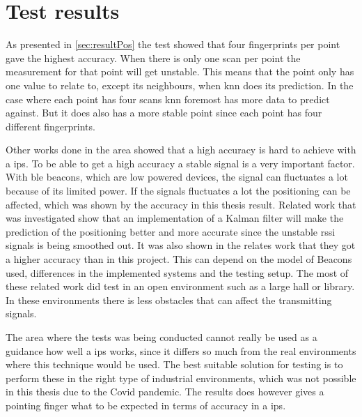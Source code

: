 \section{Test results}\label{sec:discussionResult}
As presented in \cref{sec:resultPos} the test showed that four fingerprints per point gave the highest accuracy.
When there is only one scan per point the measurement for that point will get unstable. 
This means that the point only has one value to relate to, except its neighbours, when \acrshort{knn} does its prediction.
In the case where each point has four scans \acrshort{knn} foremost has more data to predict against.
But it does also has a more stable point since each point has four different fingerprints.

\bigskip

Other works done in the area showed that a high accuracy is hard to achieve with a \acrshort{ips}.
To be able to get a high accuracy a stable signal is a very important factor.
With \acrshort{ble} beacons, which are low powered devices, the signal can fluctuates a lot because of its limited power.
If the signals fluctuates a lot the positioning can be affected, which was shown by the accuracy in this thesis result.
Related work that was investigated show that an implementation of a Kalman filter will make the prediction of the positioning better and more accurate since the unstable \acrshort{rssi} signals is being smoothed out.
It was also shown in the relates work that they got a higher accuracy than in this project.
This can depend on the model of Beacons used, differences in the implemented systems and the testing setup.
The most of these related work did test in an open environment such as a large hall or library.
In these environments there is less obstacles that can affect the transmitting signals.

\bigskip

The area where the tests was being conducted cannot really be used as a guidance how well a \acrshort{ips} works, since it differs so much from the real environments where this technique would be used.
The best suitable solution for testing is to perform these in the right type of industrial environments, which was not possible in this thesis due to the Covid pandemic.
The results does however gives a pointing finger what to be expected in terms of accuracy in a \acrshort{ips}.





